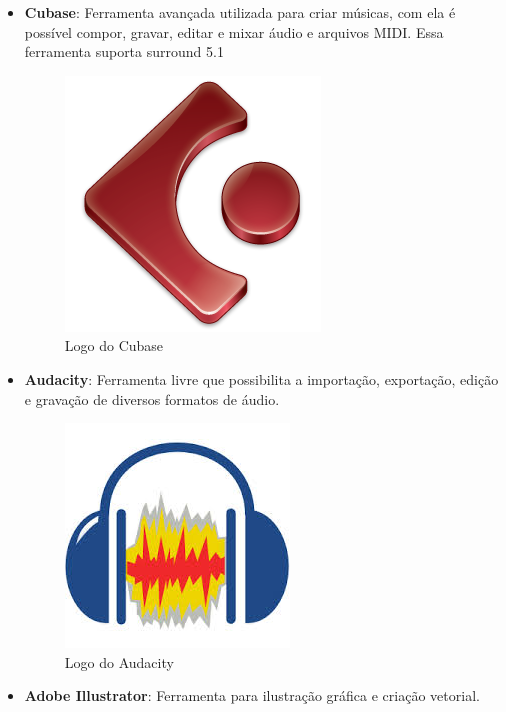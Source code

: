 \documentclass[11pt]{article} %
\begin{document}
\begin{itemize}

\item \textbf{Cubase}: Ferramenta avançada utilizada para criar músicas, com ela é possível compor, gravar, editar e mixar áudio e arquivos MIDI. Essa ferramenta suporta surround 5.1

\newpage

\begin{figure}[!htp]
\centering
\includegraphics[scale=0.3]{pictures/cubase-Logo.png}
\caption{Logo do Cubase}
\label{Cubase}
\end{figure}

\item \textbf{Audacity}: Ferramenta livre que possibilita a importação, exportação, edição e gravação de diversos formatos de áudio.

\begin{figure}[!htp]
\centering
\includegraphics[scale=0.3]{pictures/audacity.jpg}
\caption{Logo do Audacity}
\label{Audacity}
\end{figure}

\item \textbf{Adobe Illustrator}: Ferramenta para ilustração gráfica e criação vetorial.


\end{itemize}
\end{document}
